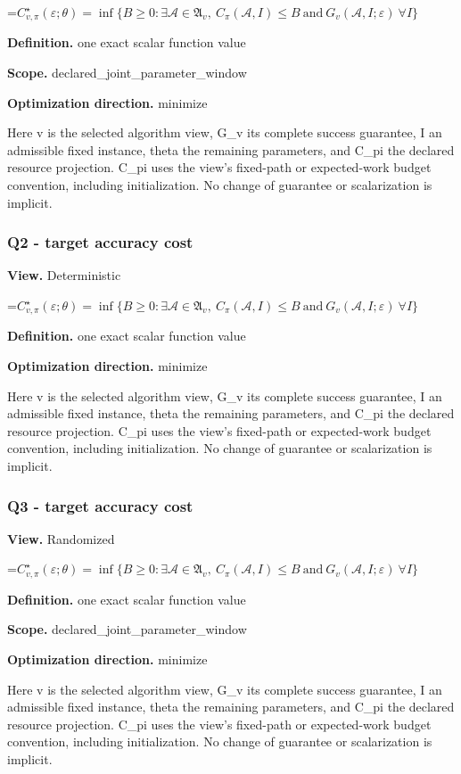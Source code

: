 \documentclass[10pt,a4paper]{article}
\newcommand{\AtlasMath}[1]{\par\begingroup\centering\setbox0=\hbox{$\displaystyle #1$}\ifdim\wd0>1.4\linewidth\typeout{ATLAS WIDE FORMULA: \the\wd0}\fi\ifdim\wd0>\linewidth\resizebox{\linewidth}{!}{\box0}\else\box0\fi\par\endgroup}
\begin{document}
\AtlasMath{C^\star_{v,\pi}(\varepsilon;\theta)=\inf\{B\ge0:\exists\mathcal A\in\mathfrak A_v,\ C_\pi(\mathcal A,I)\le B\ \text{and}\ G_v(\mathcal A,I;\varepsilon)\ \forall I\}}
\textbf{Definition.} one exact scalar function value

\textbf{Scope.} declared\_joint\_parameter\_window

\textbf{Optimization direction.} minimize

Here v is the selected algorithm view, G\_v its complete success guarantee, I an admissible fixed instance, theta the remaining parameters, and C\_pi the declared resource projection. C\_pi uses the view's fixed-path or expected-work budget convention, including initialization. No change of guarantee or scalarization is implicit.

\subsubsection{Q2 - target accuracy cost}
\textbf{View.} Deterministic

\AtlasMath{C^\star_{v,\pi}(\varepsilon;\theta)=\inf\{B\ge0:\exists\mathcal A\in\mathfrak A_v,\ C_\pi(\mathcal A,I)\le B\ \text{and}\ G_v(\mathcal A,I;\varepsilon)\ \forall I\}}
\textbf{Definition.} one exact scalar function value

\textbf{Optimization direction.} minimize

Here v is the selected algorithm view, G\_v its complete success guarantee, I an admissible fixed instance, theta the remaining parameters, and C\_pi the declared resource projection. C\_pi uses the view's fixed-path or expected-work budget convention, including initialization. No change of guarantee or scalarization is implicit.

\subsubsection{Q3 - target accuracy cost}
\textbf{View.} Randomized

\AtlasMath{C^\star_{v,\pi}(\varepsilon;\theta)=\inf\{B\ge0:\exists\mathcal A\in\mathfrak A_v,\ C_\pi(\mathcal A,I)\le B\ \text{and}\ G_v(\mathcal A,I;\varepsilon)\ \forall I\}}
\textbf{Definition.} one exact scalar function value

\textbf{Scope.} declared\_joint\_parameter\_window

\textbf{Optimization direction.} minimize

Here v is the selected algorithm view, G\_v its complete success guarantee, I an admissible fixed instance, theta the remaining parameters, and C\_pi the declared resource projection. C\_pi uses the view's fixed-path or expected-work budget convention, including initialization. No change of guarantee or scalarization is implicit.
\end{document}
